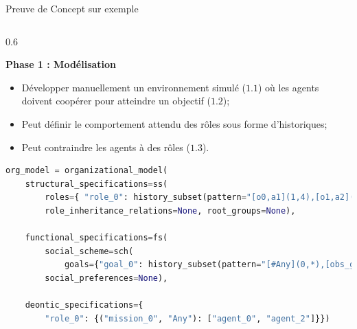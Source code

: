 \begin{frame}[fragile]{Preuve de Concept sur exemple}{}

    \begin{columns}

        \begin{column}{0.6\textwidth}
    
            \textbf{Phase 1 : Modélisation}
    
            \begin{itemize}
                \item Développer manuellement un environnement simulé ($1.1$) où les agents doivent coopérer pour atteindre un objectif ($1.2$);
                \item Peut définir le comportement attendu des rôles sous forme d'historiques;
                \item Peut contraindre les agents à des rôles ($1.3$).
            \end{itemize}
    
            \begin{lstlisting}[language=Python,basicstyle=\scriptsize]
org_model = organizational_model(
    structural_specifications=ss(
        roles={ "role_0": history_subset(pattern="[o0,a1](1,4),[o1,a2](1,2)")},
        role_inheritance_relations=None, root_groups=None),
    
    functional_specifications=fs(
        social_scheme=sch(
            goals={"goal_0": history_subset(pattern="[#Any](0,*),[obs_goal_0]")},missions=["mission_0"], goals_structure=None,mission_to_goals={"mission_0": ["goal_0"]},mission_to_agent_cardinality=None),
        social_preferences=None),

    deontic_specifications={
        "role_0": {("mission_0", "Any"): ["agent_0", "agent_2"]}})\end{lstlisting}

        \end{column}
    

\end{columns}
\end{frame}
